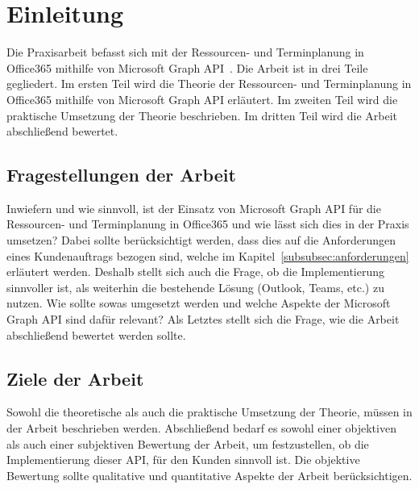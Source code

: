 


\section{Einleitung}\label{sec:einleitung}
Die Praxisarbeit befasst sich mit der Ressourcen- und Terminplanung in Office365 mithilfe von Microsoft Graph API~\cite{microsoftGraphApi}.
Die Arbeit ist in drei Teile gegliedert.
Im ersten Teil wird die Theorie der Ressourcen- und Terminplanung in Office365 mithilfe von Microsoft Graph API erläutert.
Im zweiten Teil wird die praktische Umsetzung der Theorie beschrieben.
Im dritten Teil wird die Arbeit abschließend bewertet.
    \newline
    \subsection{Fragestellungen der Arbeit}\label{subsec:fragestellungen-der-arbeit}
Inwiefern und wie sinnvoll, ist der Einsatz von Microsoft Graph API für die Ressourcen- und Terminplanung in Office365 und wie lässt sich dies in der Praxis umsetzen?
Dabei sollte berücksichtigt werden, dass dies auf die Anforderungen eines Kundenauftrags bezogen sind, welche im Kapitel~\ref{subsubsec:anforderungen} erläutert werden.
Deshalb stellt sich auch die Frage, ob die Implementierung sinnvoller ist, als weiterhin die bestehende Lösung (Outlook, Teams, etc.) zu nutzen.
Wie sollte sowas umgesetzt werden und welche Aspekte der Microsoft Graph API sind dafür relevant?
Als Letztes stellt sich die Frage, wie die Arbeit abschließend bewertet werden sollte.

\subsection{Ziele der Arbeit}\label{subsec:ziele-der-arbeit}
Sowohl die theoretische als auch die praktische Umsetzung der Theorie, müssen in der Arbeit beschrieben werden.
Abschließend bedarf es sowohl einer objektiven als auch einer subjektiven Bewertung der Arbeit, um festzustellen, ob die Implementierung dieser API, für den Kunden sinnvoll ist.
Die objektive Bewertung sollte qualitative und quantitative Aspekte der Arbeit berücksichtigen.
